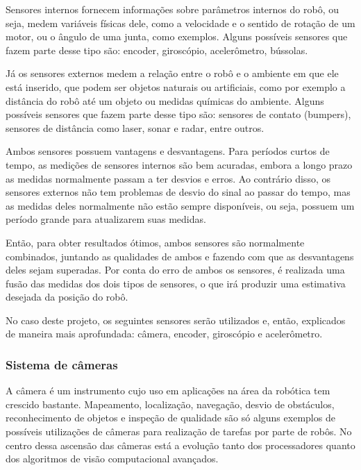 \documentclass[acronym, symbols, table]{fei}
\begin{document}
			Sensores internos fornecem informações sobre parâmetros internos do robô, ou seja, medem variáveis físicas dele, como a velocidade e o sentido de rotação de um motor, ou o ângulo de uma junta, como exemplos. Alguns possíveis sensores que fazem parte desse tipo são: encoder, giroscópio, acelerômetro, bússolas.
			
			Já os sensores externos medem a relação entre o robô e o ambiente em que ele está inserido, que podem ser objetos naturais ou artificiais, como por exemplo a distância do robô até um objeto ou medidas químicas do ambiente. Alguns possíveis sensores que fazem parte desse tipo são: sensores de contato (bumpers), sensores de distância como laser, sonar e radar, entre outros.
			
			Ambos sensores possuem vantagens e desvantagens. Para períodos curtos de tempo, as medições de sensores internos são bem acuradas, embora a longo prazo as medidas normalmente passam a ter desvios e erros. Ao contrário disso, os sensores externos não tem problemas de desvio do sinal ao passar do tempo, mas as medidas deles normalmente não estão sempre disponíveis, ou seja, possuem um período grande para atualizarem suas medidas.
			
			Então, para obter resultados ótimos, ambos sensores são normalmente combinados, juntando as qualidades de ambos e fazendo com que as desvantagens deles sejam superadas. Por conta do erro de ambos os sensores, é realizada uma fusão das medidas dos dois tipos de sensores, o que irá produzir uma estimativa desejada da posição do robô.
			
			No caso deste projeto, os seguintes sensores serão utilizados e, então, explicados de maneira mais aprofundada: câmera, encoder, giroscópio e acelerômetro.
			
			\subsubsection{Sistema de câmeras} \label{sec:sensores_cameras}
			
				A câmera é um instrumento cujo uso em aplicações na área da robótica tem crescido bastante. Mapeamento, localização, navegação, desvio de obstáculos, reconhecimento de objetos e inspeção de qualidade são só alguns exemplos de possíveis utilizações de câmeras para realização de tarefas por parte de robôs. No centro dessa ascensão das câmeras está a evolução tanto dos processadores quanto dos algoritmos de visão computacional avançados.
				
\end{document}
